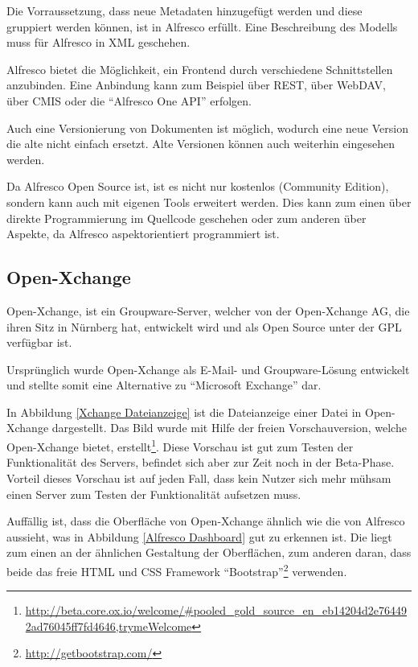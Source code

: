 Die Vorraussetzung, dass neue Metadaten hinzugef\"ugt werden und diese gruppiert werden k\"onnen, ist in Alfresco erf\"ullt. Eine Beschreibung des Modells muss f\"ur Alfresco in XML geschehen. \cite{Alfresco_Custom_Content_Types} \cite{Professional_Alfresco}

Alfresco bietet die M\"oglichkeit, ein Frontend durch verschiedene Schnittstellen anzubinden. Eine Anbindung kann zum Beispiel \"uber \ac{REST}, \"uber WebDAV, \"uber \ac{CMIS} oder die "`Alfresco One \ac{API}"' erfolgen. \cite{Alfrsco_Doku}

Auch eine Versionierung von Dokumenten ist m\"oglich, wodurch eine neue Version die alte nicht einfach ersetzt. Alte Versionen k\"onnen auch weiterhin eingesehen werden.

Da Alfresco Open Source ist, ist es nicht nur kostenlos (Community Edition), sondern kann auch mit eigenen Tools erweitert werden. Dies kann zum einen \"uber direkte Programmierung im Quellcode geschehen oder zum anderen \"uber Aspekte, da Alfresco aspektorientiert programmiert ist. \cite{Alfresco_und_Liferay}

\subsection{Open-Xchange} \label{Open Xchange}
Open-Xchange, ist ein Groupware-Server, welcher von der Open-Xchange AG, die ihren Sitz in N\"urnberg hat, entwickelt wird und als Open Source unter der \ac{GPL} verf\"ugbar ist. \cite{Xchange_Seite} \cite{Xchange_Golem}

Urspr\"unglich wurde Open-Xchange als E-Mail- und Groupware-L\"osung entwickelt und stellte somit eine Alternative zu "`Microsoft Exchange"' dar. \cite{Wiki_Xchange}

In Abbildung \ref{Xchange Dateianzeige} ist die Dateianzeige einer Datei in Open-Xchange dargestellt. Das Bild wurde mit Hilfe der freien Vorschauversion, welche Open-Xchange bietet, erstellt\footnote{\url{http://beta.core.ox.io/welcome/\#pooled\_gold\_source\_en\_eb14204d2e764492ad76045ff7fd4646,trymeWelcome}}. Diese Vorschau ist gut zum Testen der Funktionalit\"at des Servers, befindet sich aber zur Zeit noch in der Beta-Phase. Vorteil dieses Vorschau ist auf jeden Fall, dass kein Nutzer sich mehr m\"uhsam einen Server zum Testen der Funktionalit\"at aufsetzen muss.

Auff\"allig ist, dass die Oberfl\"ache von Open-Xchange \"ahnlich wie die von Alfresco aussieht, was in Abbildung \ref{Alfresco Dashboard} gut zu erkennen ist. Die liegt zum einen an der \"ahnlichen Gestaltung der Oberfl\"achen, zum anderen daran, dass beide das freie HTML und CSS Framework "`Bootstrap"'\footnote{\url{http://getbootstrap.com/}} verwenden.

